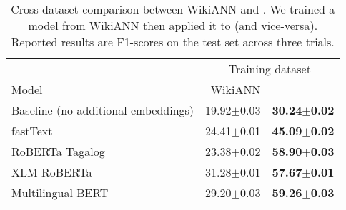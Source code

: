 \documentclass[../report.tex]{subfiles}
\begin{document}
\begin{table*}[t]
\centering
{
\begin{tabular}{@{}lrr@{}}
\toprule
           & \multicolumn{2}{c}{Training dataset} \\ \cmidrule{2-3}
Model      & WikiANN   & \tlunified{}             \\ \midrule
Baseline (no additional embeddings)          & 19.92$\pm$0.03 & \textbf{30.24$\pm$0.02}  \\
fastText  \cite{Bojanowski2016EnrichingWV}   & 24.41$\pm$0.01 & \textbf{45.09$\pm$0.02}  \\
RoBERTa Tagalog \cite{Cruz2021ImprovingLL}   & 23.38$\pm$0.02 & \textbf{58.90$\pm$0.03}  \\
XLM-RoBERTa \cite{Conneau2019UnsupervisedCR} & 31.28$\pm$0.01 & \textbf{57.67$\pm$0.01}  \\
Multilingual BERT \cite{Devlin2019BERTPO}    & 29.20$\pm$0.03 & \textbf{59.26$\pm$0.03}  \\
\bottomrule
\end{tabular}

}

\caption{
    Cross-dataset comparison between WikiANN \citep{Pan2017CrosslingualNT} and \tlunified{}.
    We trained a model from WikiANN then applied it to \tlunified{} (and vice-versa).
    Reported results are F1-scores on the test set across three trials.
}
\label{table:results_wikiann}
\end{table*}
\end{document}
